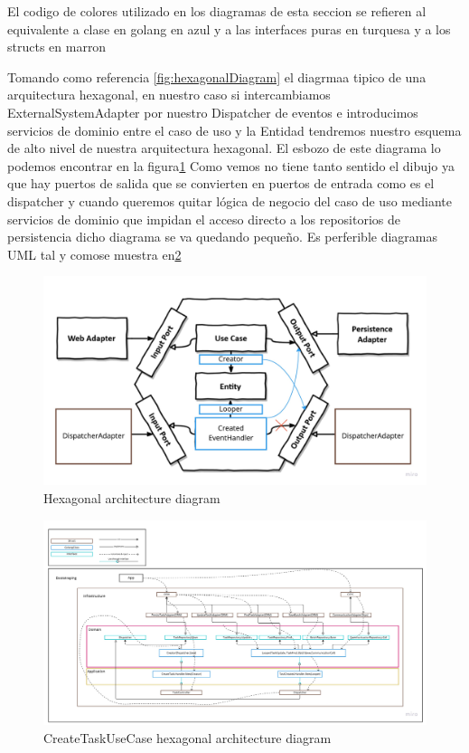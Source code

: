 
El codigo de colores utilizado en los diagramas de esta seccion se refieren al equivalente a clase en golang en azul y a las interfaces puras en turquesa  y a los structs en marron

Tomando como referencia \ref{fig:hexagonalDiagram} el diagrmaa tipico de una arquitectura hexagonal, en nuestro caso si intercambiamos ExternalSystemAdapter por nuestro Dispatcher de eventos e introducimos servicios de dominio entre el caso de uso y la Entidad tendremos nuestro esquema de alto nivel de nuestra arquitectura hexagonal. El esbozo de este diagrama lo podemos encontrar en la figura\ref{fig:CreateTaskHexagonalDiagram} Como vemos no tiene tanto sentido el dibujo ya que hay puertos de salida que se convierten en puertos de entrada como es el dispatcher y cuando queremos quitar lógica de negocio del caso de uso mediante servicios de dominio que impidan el acceso directo a los repositorios de persistencia dicho diagrama se va quedando pequeño. Es perferible diagramas UML tal y comose muestra en\ref{fig:createTaskUseCaseArchitecture}

\begin{figure}[H]
    \centering
    \includegraphics[height=0.3\textheight]{./part/Ejecucion/Seguimiento/CreateTaskUseCase/img/CreateTaskHexagonalDiagram}
    \caption{Hexagonal architecture diagram}\label{fig:CreateTaskHexagonalDiagram}
\end{figure}

\begin{figure}[H]
    \centering
    \includegraphics[height=0.3\textheight]{./part/Ejecucion/Seguimiento/CreateTaskUseCase/img/createTaskUseCaseArchitecture}
    \caption{CreateTaskUseCase hexagonal architecture diagram}\label{fig:createTaskUseCaseArchitecture}
\end{figure}

